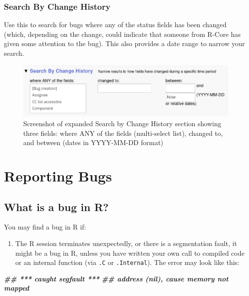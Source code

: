 \documentclass[
]{book}
\newenvironment{Shaded}{\begin{snugshade}}{\end{snugshade}}
\newcommand{\DocumentationTok}[1]{\textcolor[rgb]{0.56,0.35,0.01}{\textbf{\textit{#1}}}}
\providecommand{\tightlist}{%
  \setlength{\itemsep}{0pt}\setlength{\parskip}{0pt}}
\begin{document}
\subsection{Search By Change History}\label{searching-sbch}

Use this to search for bugs where any of the status fields has been changed (which, depending on the change, could indicate that someone from R-Core has given some attention to the bug).
This also provides a date range to narrow your search.

\begin{figure}
\centering
\includegraphics{img/bugzilla-adv-search-search-by-change-history.png}
\caption{Screenshot of expanded Search by Change History section showing three fields: where ANY of the fields (multi-select list), changed to, and between (dates in YYYY-MM-DD format)}
\end{figure}

\chapter{Reporting Bugs}\label{ReportingBugs}

\section{What is a bug in R?}\label{what-is-a-bug-in-r}

You may find a bug in R if:

\begin{enumerate}
\def\labelenumi{\arabic{enumi}.}
\tightlist
\item
  The R session terminates unexpectedly, or there is a segmentation fault, it might be a bug in R, unless you have written your own call to compiled code or an internal function (via \texttt{.C} or \texttt{.Internal}). The error may look like this:
\end{enumerate}

\begin{Shaded}
\begin{Highlighting}[]
\DocumentationTok{\#\#  *** caught segfault ***}
\DocumentationTok{\#\# address (nil), cause \textquotesingle{}memory not mapped\textquotesingle{}}
\end{Highlighting}
\end{Shaded}
\end{document}
